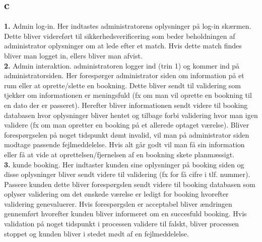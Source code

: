 \documentclass[12pt,a4paper]{article}
\begin{document}
\subsection{c}
\textbf{1.} Admin log-in. Her indtastes administratorens oplysninger på log-in skærmen. Dette bliver 	videreført til sikkerhedsverificering som beder beholdningen af administrator oplysninger 	om at lede efter et match. Hvis dette match findes bliver man logget in, ellers bliver man 	afvist. \\
	\textbf{2.} Admin interaktion. administratoren logger ind (trin 1) og kommer ind på 	administratorsiden. Her forespørger administrator siden om information på et rum eller at 	oprette/slette en bookning. Dette bliver sendt til validering som tjekker om informationen er 	meningsfuld (fx om man vil oprette en bookning til en dato der er passeret). Herefter bliver 	informationen sendt videre til booking databasen hvor oplysninger bliver hentet og tilbage 	forbi validering hvor man igen validere (fx om man opretter en booking på et allerede 	optaget værelse). Bliver forespørgselen på noget tidspunkt dømt invalid, vil man på 	administrator siden modtage passende fejlmeddelelse. Hvis alt går godt vil man få sin 	information eller få at vide at oprettelsen/fjernelsen af en bookning skete planmæssigt.\\
	\textbf{3.} kunde booking. Her indtaster kunden sine oplysninger på booking siden og disse 	oplysninger bliver sendt videre til validering (fx for få cifre i tlf. nummer). Passere kunden 	dette bliver forespørgslen sendt videre til booking databasen som oplyser validering om det 	ønskede værelse er ledigt for booking hvorefter validering genevaluerer. Hvis forespørgslen 	er acceptabel bliver ændringen gennemført hvorefter kunden bliver informeret om en 		succesfuld booking. Hvis validation på noget tidspunkt i processen validere til falskt, bliver 	processen stoppet og kunden bliver i stedet mødt af en fejlmeddelelse.
\end{document}
